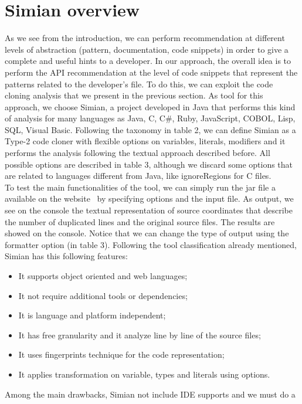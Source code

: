 \section{Simian overview}
As we see from the introduction, we can perform recommendation at different 
levels of abstraction (pattern, documentation, code snippets) in order to give 
a complete and useful hints to a developer. In our approach, the overall idea 
is to perform the API recommendation at the level of code snippets that 
represent the patterns related to the developer's file. To do this, we can 
exploit the code cloning analysis that we present in the previous section. As 
tool for this approach, we choose Simian, a project developed in Java that 
performs this kind of analysis for many languages as Java, C, C\#, Ruby, 
JavaScript, COBOL, Lisp, SQL, Visual Basic. Following the taxonomy in table 2, 
we can define Simian as a Type-2 code cloner with flexible options on 
variables, literals, modifiers and it performs the analysis following the 
textual approach described before. All possible options are described in table 
3, although we discard some options that are related to languages different 
from Java, like ignoreRegions for C files. \\
To test the main functionalities of the tool, we can simply run the jar file a 
available on the 
website~\cite{https://www.harukizaemon.com/simian/_last_nodate} by specifying 
options and the input file. As output, we see on the console the textual 
representation of source coordinates that describe the number of duplicated 
lines and the original source files. The results are showed on the console. 
Notice that we can change the type of output using the formatter option (in 
table 3). 
Following the tool classification already mentioned, Simian has this following 
features: 
\begin{itemize}
	\item It supports object oriented and web languages;
	\item It not require additional tools or dependencies;
	\item It is language and platform independent;
	\item It has free granularity and it analyze line by line of the source 
	files;
	\item It uses fingerprints technique for the code representation;
	\item It applies transformation on variable, types and literals using 
	options.
\end{itemize}
Among the main drawbacks, Simian not include IDE supports and we must do a 
